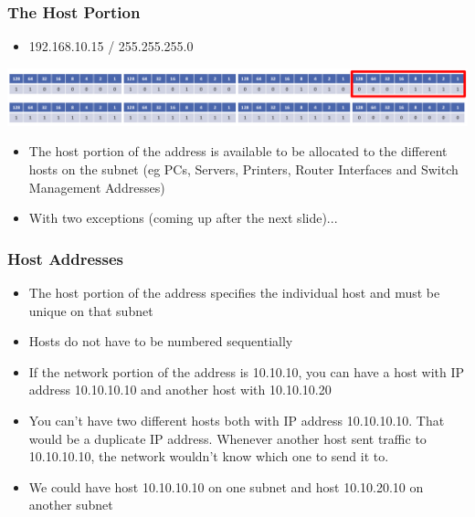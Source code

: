 \documentclass[pdflatex,compress]{beamer}
\begin{document}
\begin{frame}
	\frametitle{The Host Portion}
	\begin{itemize}
		\item 192.168.10.15 / 255.255.255.0
	\end{itemize}
	\begin{center}
		\includegraphics[width=\linewidth]{img/img28}
	\end{center}
	\begin{itemize}
		\item The host portion of the address is available to be allocated to the different hosts on the subnet (eg PCs, Servers, Printers, Router Interfaces and Switch Management Addresses)
		\item With two exceptions (coming up after the next slide)...
	\end{itemize}
\end{frame}

\begin{frame}
	\frametitle{Host Addresses}
	\begin{itemize}
		\item The host portion of the address specifies the individual host and must be unique on that subnet
		\item Hosts do not have to be numbered sequentially
		\item If the network portion of the address is 10.10.10, you can have a host with IP address 10.10.10.10 and another host with 10.10.10.20
		\item You can’t have two different hosts both with IP address 10.10.10.10. That would be a duplicate IP address. Whenever another host sent traffic to 10.10.10.10, the network wouldn’t know which one to send it to.
		\item We could have host 10.10.10.10 on one subnet and host 10.10.20.10 on another subnet
	\end{itemize}
\end{frame}
\end{document}
